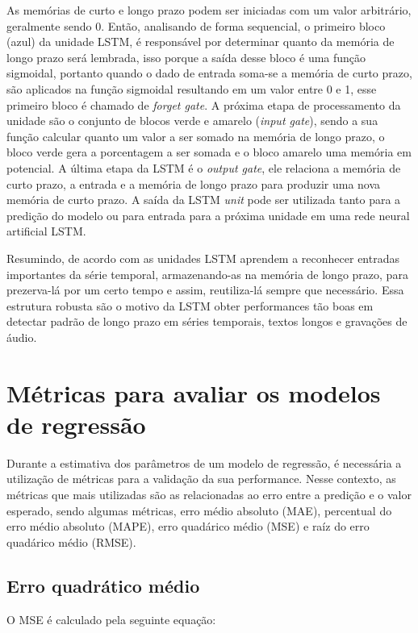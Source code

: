 \documentclass[
  12pt,		%
  a4paper,	%
  openright,%
  oneside,	%
  chapter=TITLE,		%
  section=TITLE,		%
  english,	%
  french,	%
  spanish,	%
  brazil	%
]{abntex2}
\begin{document}
    As memórias de curto e longo prazo podem ser iniciadas com um valor arbitrário, geralmente sendo 0. Então, analisando
    de forma sequencial, o primeiro bloco (azul) da unidade LSTM, é responsável por determinar quanto da memória de longo prazo será lembrada,
    isso porque a saída desse bloco é uma função sigmoidal, portanto quando o dado de entrada soma-se a memória de curto prazo, são aplicados
    na função sigmoidal resultando em um valor entre 0 e 1, esse primeiro bloco é chamado de \textit{forget gate}.
    A próxima etapa de processamento da unidade são o conjunto de blocos verde e amarelo (\textit{input gate}), sendo a sua função calcular 
    quanto um valor a ser somado na memória de longo prazo, o bloco verde gera a porcentagem a ser somada e o bloco amarelo
    uma memória em potencial.
    A última etapa da LSTM é o \textit{output gate}, ele relaciona a memória de curto prazo, a entrada e a memória de longo prazo
    para produzir uma nova memória de curto prazo. A saída da LSTM \textit{unit} pode ser utilizada tanto para a predição do modelo ou para entrada para a próxima unidade
    em uma rede neural artificial LSTM.

    Resumindo, de acordo com \cite[]{hands_on_ml} as unidades LSTM aprendem a reconhecer entradas importantes da série temporal, 
    armazenando-as na memória de longo prazo, para prezerva-lá por um certo tempo e assim, reutiliza-lá sempre que necessário. 
    Essa estrutura robusta são o motivo da LSTM obter performances tão boas em detectar padrão de longo prazo 
    em séries temporais, textos longos e gravações de áudio.


    \section{Métricas para avaliar os modelos de regressão}
    Durante a estimativa dos parâmetros de um modelo de regressão, é necessária a utilização de métricas
    para a validação da sua performance. Nesse contexto, as métricas que mais utilizadas são as relacionadas
    ao erro entre a predição e o valor esperado, sendo algumas métricas, erro médio absoluto (MAE), percentual do erro médio absoluto (MAPE), 
    erro quadárico médio (MSE) e raíz do erro quadárico médio (RMSE).

    \subsection{Erro quadrático médio}
    O MSE é calculado pela seguinte equação: 
\end{document}
